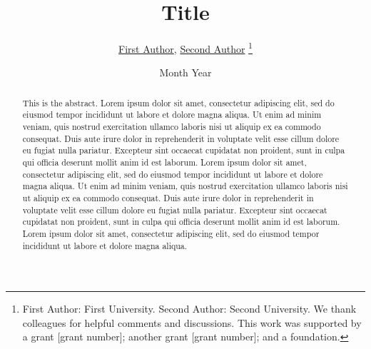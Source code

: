 \documentclass[12pt,twoside]{article}
\begin{document}


\begin{spacing}{0.9}
\begin{titlepage}



\title{Title}

\author{\large \href{https://sites.google.com/view/jaeyungkim}{First Author}, \href{https://secondauthor-website.com}{Second Author}
\thanks{First Author: First University. Second Author: Second University. We thank colleagues for helpful comments and discussions. This work was supported by a grant [grant number]; another grant [grant number]; and a foundation.}}

\date{\large Month Year}
\maketitle
\thispagestyle{titleonly}

\vspace{-0.3in}

\begin{abstract}
\noindent
This is the abstract. Lorem ipsum dolor sit amet, consectetur adipiscing elit, sed do
eiusmod tempor incididunt ut labore et dolore magna aliqua. Ut enim ad minim veniam,
quis nostrud exercitation ullamco laboris nisi ut aliquip ex ea commodo consequat. Duis
aute irure dolor in reprehenderit in voluptate velit esse cillum dolore eu fugiat nulla
pariatur. Excepteur sint occaecat cupidatat non proident, sunt in culpa qui officia deserunt
mollit anim id est laborum. Lorem ipsum dolor sit amet, consectetur adipiscing elit, sed do
eiusmod tempor incididunt ut labore et dolore magna aliqua. Ut enim ad minim veniam,
quis nostrud exercitation ullamco laboris nisi ut aliquip ex ea commodo consequat. Duis
aute irure dolor in reprehenderit in voluptate velit esse cillum dolore eu fugiat nulla
pariatur. Excepteur sint occaecat cupidatat non proident, sunt in culpa qui officia deserunt
mollit anim id est laborum. Lorem ipsum dolor sit amet, consectetur adipiscing elit, sed
do eiusmod tempor incididunt ut labore et dolore magna aliqua.
\end{abstract}


\end{titlepage}
\end{spacing}
\end{document}
